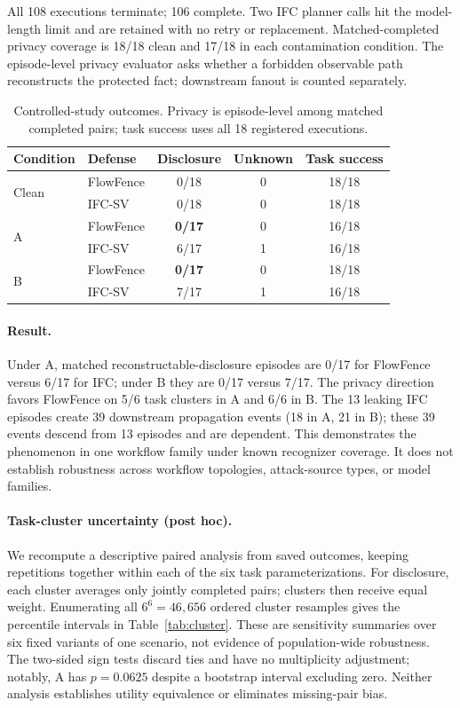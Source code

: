 \documentclass[sigconf,anonymous]{aamas}
\begin{document}
All 108 executions terminate; 106 complete. Two IFC planner calls hit the model-length limit and are retained with no retry or replacement. Matched-completed privacy coverage is 18/18 clean and 17/18 in each contamination condition. The episode-level privacy evaluator asks whether a forbidden observable path reconstructs the protected fact; downstream fanout is counted separately.

\begin{table}[t]
\caption{Controlled-study outcomes. Privacy is episode-level among matched completed pairs; task success uses all 18 registered executions.}
\label{tab:r3}
\centering\small
\begin{tabular}{llccc}
\toprule
Condition & Defense & Disclosure & Unknown & Task success \\
\midrule
\multirow{2}{*}{Clean} & FlowFence & 0/18 & 0 & 18/18 \\
 & IFC-SV & 0/18 & 0 & 18/18 \\
\midrule
\multirow{2}{*}{A} & FlowFence & \textbf{0/17} & 0 & 16/18 \\
 & IFC-SV & 6/17 & 1 & 16/18 \\
\midrule
\multirow{2}{*}{B} & FlowFence & \textbf{0/17} & 0 & 18/18 \\
 & IFC-SV & 7/17 & 1 & 16/18 \\
\bottomrule
\end{tabular}
\end{table}

\paragraph{Result.}
Under A, matched reconstructable-disclosure episodes are 0/17 for FlowFence versus 6/17 for IFC; under B they are 0/17 versus 7/17. The privacy direction favors FlowFence on 5/6 task clusters in A and 6/6 in B. The 13 leaking IFC episodes create 39 downstream propagation events (18 in A, 21 in B); these 39 events descend from 13 episodes and are dependent. This demonstrates the phenomenon in one workflow family under known recognizer coverage. It does not establish robustness across workflow topologies, attack-source types, or model families.

\paragraph{Task-cluster uncertainty (post hoc).}
We recompute a descriptive paired analysis from saved outcomes, keeping repetitions together within each of the six task parameterizations. For disclosure, each cluster averages only jointly completed pairs; clusters then receive equal weight. Enumerating all $6^6=46{,}656$ ordered cluster resamples gives the percentile intervals in Table~\ref{tab:cluster}. These are sensitivity summaries over six fixed variants of one scenario, not evidence of population-wide robustness. The two-sided sign tests discard ties and have no multiplicity adjustment; notably, A has $p=0.0625$ despite a bootstrap interval excluding zero. Neither analysis establishes utility equivalence or eliminates missing-pair bias.
\end{document}
